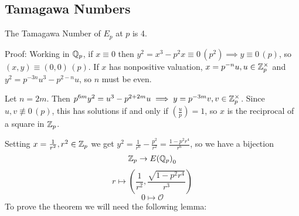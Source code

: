 \documentclass[12pt, a4paper]{amsart}
\begin{document}
\subsection{Tamagawa Numbers}


\begin{thm}
  The Tamagawa Number of $E_p$ at $p$ is 4.
\end{thm}
Proof: Working in ${\mathbb Q}_p$, if $x \equiv 0$ then $y^2 = x^3 - p^2 x \equiv 0 \,
(p^2) \implies y \equiv 0 \, (p)$, so $(x, y) \equiv (0,0) \, (p)$.
If $x$ has nonpositive valuation, $x = p^{-n} u, u \in {\mathbb Z}_p^{\times}$ and $y^2 =
p^{-3n}u^3 - p^{2-n} u$, so $n$ must be even. 

Let $n = 2m$. Then $p^{6m} y^2 = u^3 - p^{2+2m}u \implies y = p^{-3m}v, v \in
{\mathbb Z}_p^{\times}$. Since $u, v \not\equiv 0 
\, (p)$, this has solutions if and only if $(\frac{u}{p}) = 1$, so $x$ is the
reciprocal of a square in ${\mathbb Z}_p$.

Setting $x = \frac {1}{r^2}, r^2 \in {\mathbb Z}_p$ we get $y^2 = \frac{1}{r^6} -
\frac{p^2}{r^2} = \frac{1 - p^2r^4}{r^6}$, so we have a bijection
\[{\mathbb Z}_p \rightarrow {E({\mathbb Q}_p)}_0\]
\[r \mapsto (\frac{1}{r^2}, \frac{\sqrt{1-p^2r^4}}{r^3})\]
\[0 \mapsto \mathcal O\]
To prove the theorem we will need the following lemma:
\end{document}
